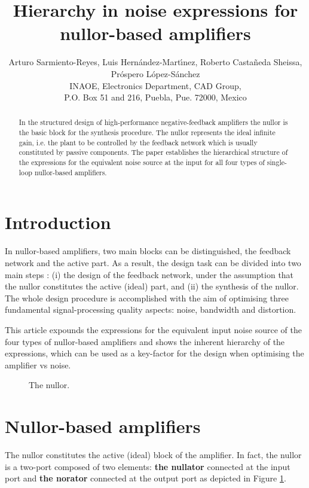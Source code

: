 \documentclass{ecctd01}
\title{
Hierarchy in noise expressions for nullor-based amplifiers
}
\author{
Arturo Sarmiento-Reyes, Luis Hern\'andez-Mart\'{\i}nez,
Roberto Casta\~neda Sheissa,\\
Pr\'ospero L\'opez-S\'anchez\\
INAOE, Electronics Department, CAD Group, \\
P.O. Box 51 and 216, Puebla, Pue. 72000, Mexico
}
\begin{document}

\maketitle

\begin{abstract}
In the structured design of high-performance negative-feedback amplifiers
the nullor is the basic block for the synthesis procedure.
The nullor represents the ideal infinite gain, i.e. the plant to be
controlled by the feedback network which is usually constituted by
passive components.
The paper establishes the hierarchical structure of the expressions for
the equivalent noise source at the input for all four types of single-loop
nullor-based amplifiers.
\end{abstract}

\section{Introduction}
In nullor-based amplifiers, two main blocks can be distinguished, the
feedback network and the active part.
As a result, the design task can be divided into two main steps
\cite{bias1, bias2,arizona}:
(i) the design of the feedback network, under the assumption that the
nullor constitutes the active (ideal) part, and
(ii) the synthesis of the nullor.
The whole design procedure is accomplished with the aim of optimising
three fundamental signal-processing quality aspects: noise, bandwidth
and distortion.

This article expounds the expressions for the equivalent input noise
source of the four types of nullor-based amplifiers and shows the inherent
hierarchy of the expressions, which can be used as a key-factor for
the design when optimising the amplifier vs noise.

\begin{figure}[hbtp]
\centerline{
\epsfxsize=70mm
}
\caption{The nullor.}
\label{figure1}
\end{figure} 

\section{Nullor-based amplifiers}
The nullor constitutes the active (ideal) block of the amplifier.
In fact, the nullor is a two-port
composed of two elements:
{\bfseries \sffamily the nullator} connected at the input port
and
{\bfseries \sffamily the norator} connected at the output port
as depicted in Figure \ref{figure1}.
\end{document}
